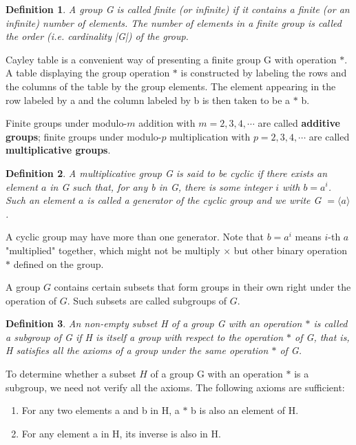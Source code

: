 \documentclass[11pt]{article}
\newtheorem{definition}{Definition}
\begin{document}
\begin{definition}
  A group G is called finite (or infinite) if it contains a finite (or an infinite) number of elements. The number of elements in a finite group is called the order (i.e. cardinality |G|) of the group.
\end{definition}

Cayley table is a convenient way of presenting a finite group G with operation $\ast$. A table displaying the group operation $\ast$ is constructed by labeling the rows and the columns of the table by the group elements. The element appearing in the row labeled by a and the column labeled by b is then taken to be a $\ast$ b.

Finite groups under modulo-$m$ addition with $m =2, 3, 4,\cdots$ are called \textbf{additive groups}; finite groups under modulo-$p$ multiplication with $p = 2, 3, 4,\cdots$ are called \textbf{multiplicative groups}.

\begin{definition}
  A multiplicative group G is said to be cyclic if there exists an element $a$ in G such that, for any b in G, there is some integer $i$ with $b = a^i$. 
  Such an element $a$ is called a generator of the cyclic group and we write G $= \langle a \rangle$.
\end{definition}
A cyclic group may have more than one generator. Note that $b = a^i$ means $i$-th $a$ "multiplied" together, which might not be multiply $\times$ but other binary operation $\ast$ defined on the group.

A group $G$ contains certain subsets that form groups in their own right under the operation of $G$. Such subsets are called subgroups of $G$.
\begin{definition}
  An non-empty subset H of a group G with an operation $\ast$ is called a subgroup of G if H is itself a group with respect to the operation $\ast$ of G, that is, H satisfies all the axioms of a group under the same operation $\ast$ of G.
\end{definition}
To determine whether a subset $H$ of a group G with an operation $\ast$ is a subgroup, we need not verify all the axioms. The following axioms are sufficient:
\begin{enumerate}
  \item For any two elements a and b in H, a $\ast$ b is also an element of H.
  \item For any element a in H, its inverse is also in H.
\end{enumerate}
\end{document}
